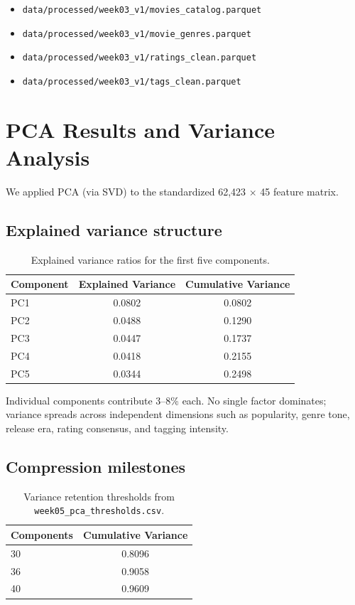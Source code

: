 \documentclass[11pt]{article}
\begin{document}
\begin{itemize}[leftmargin=1.5em]
    \item \texttt{data/processed/week03\_v1/movies\_catalog.parquet}
    \item \texttt{data/processed/week03\_v1/movie\_genres.parquet}
    \item \texttt{data/processed/week03\_v1/ratings\_clean.parquet}
    \item \texttt{data/processed/week03\_v1/tags\_clean.parquet}
\end{itemize}

\section{PCA Results and Variance Analysis}

We applied PCA (via SVD) to the standardized 62,423 \(\times\) 45 feature matrix.

\subsection{Explained variance structure}

\begin{table}[H]
\centering
\begin{tabular}{lcc}
\toprule
Component & Explained Variance & Cumulative Variance \\
\midrule
PC1 & 0.0802 & 0.0802 \\
PC2 & 0.0488 & 0.1290 \\
PC3 & 0.0447 & 0.1737 \\
PC4 & 0.0418 & 0.2155 \\
PC5 & 0.0344 & 0.2498 \\
\bottomrule
\end{tabular}
\caption{Explained variance ratios for the first five components.}
\end{table}

Individual components contribute 3--8\% each. No single factor dominates; variance spreads across independent dimensions such as popularity, genre tone, release era, rating consensus, and tagging intensity.

\subsection{Compression milestones}

\begin{table}[H]
\centering
\begin{tabular}{lc}
\toprule
Components & Cumulative Variance \\
\midrule
30 & 0.8096 \\
36 & 0.9058 \\
40 & 0.9609 \\
\bottomrule
\end{tabular}
\caption{Variance retention thresholds from \texttt{week05\_pca\_thresholds.csv}.}
\end{table}
\end{document}
